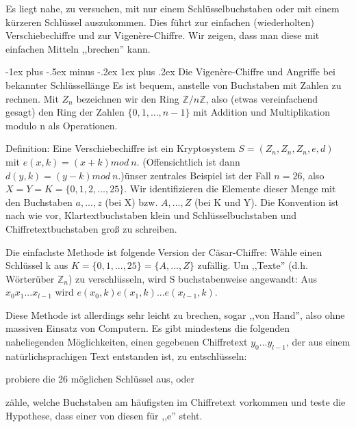 \documentclass[a4paper]{article}
\makeatletter
\renewcommand{\subsubsection}{\@startsection{subsubsection}{3}{0mm}%
 {-1ex plus -.5ex minus -.2ex}%
 {1ex plus .2ex}%
 {\normalfont\small\bfseries}}
\makeatother
\begin{document}
\begin{multicols}{3}
    Es liegt nahe, zu versuchen, mit nur einem Schlüsselbuchstaben oder mit einem kürzeren Schlüssel auszukommen. Dies führt zur einfachen (wiederholten) Verschiebechiffre und zur Vigenère-Chiffre. Wir zeigen, dass man diese mit einfachen Mitteln ,,brechen'' kann.

    \subsubsection{Die Vigenère-Chiffre und Angriffe bei bekannter Schlüssellänge}
    Es ist bequem, anstelle von Buchstaben mit Zahlen zu rechnen. Mit $Z_n$ bezeichnen wir den Ring $\mathbb{Z}/n\mathbb{Z}$, also (etwas vereinfachend gesagt) den Ring der Zahlen $\{0,1,...,n-1\}$ mit Addition und Multiplikation modulo n als Operationen.

    Definition: Eine Verschiebechiffre ist ein Kryptosystem $S=(Z_n,Z_n,Z_n,e,d)$ mit $e(x,k)=(x+k) mod\ n$. (Offensichtlich ist dann $d(y,k)=(y-k)mod\ n$.)ünser zentrales Beispiel ist der Fall $n=26$, also $X=Y=K=\{0,1,2,...,25\}$. Wir identifizieren die Elemente dieser Menge mit den Buchstaben $a,...,z$ (bei X) bzw. $A,...,Z$ (bei K und Y). Die Konvention ist nach wie vor, Klartextbuchstaben klein und Schlüsselbuchstaben und Chiffretextbuchstaben groß zu schreiben.

    Die einfachste Methode ist folgende Version der Cäsar-Chiffre: Wähle einen Schlüssel k aus $K=\{0,1,...,25\}=\{A,...,Z\}$ zufällig. Um ,,Texte'' (d.h. Wörterüber $\mathbb{Z}_n$) zu verschlüsseln, wird S buchstabenweise angewandt: Aus $x_0 x_1...x_{l-1}$ wird $e(x_0,k)e(x_1,k)...e(x_{l-1},k)$.

    Diese Methode ist allerdings sehr leicht zu brechen, sogar ,,von Hand'', also ohne massiven Einsatz von Computern. Es gibt mindestens die folgenden naheliegenden Möglichkeiten, einen gegebenen Chiffretext $y_0...y_{l-1}$, der aus einem natürlichsprachigen Text entstanden ist, zu entschlüsseln:
    \begin{enumerate*}
        \item probiere die 26 möglichen Schlüssel aus, oder
        \item zähle, welche Buchstaben am häufigsten im Chiffretext vorkommen und teste die Hypothese, dass einer von diesen für ,,e'' steht.
    \end{enumerate*}


\end{multicols}
\end{document}

